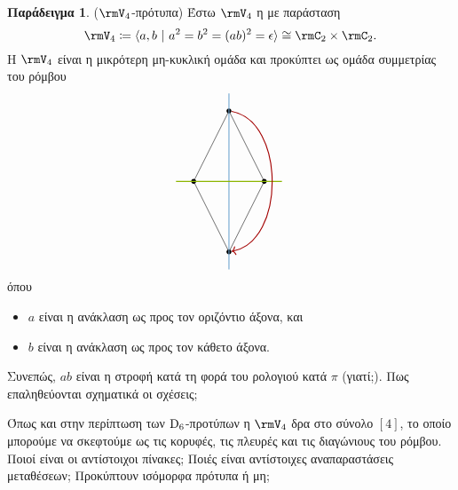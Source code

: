 \documentclass[12pt,a4paper,reqno]{amsart}
\theoremstyle{definition}
\newtheorem*{example}{Παράδειγμα}
\newcommand{\defn}[1]{{\color{mylightblue}{#1}}}
\begin{document}
\begin{example}{\rm($\rmV_4$-πρότυπα)}
    Έστω $\rmV_4$ η \defn{4-ομάδα του Klein} με παράσταση
    \[
    \rmV_4 \coloneqq 
    \langle a, b \ \vert \ a^2 = b^2 = (ab)^2 = \epsilon \rangle  \cong \rmC_2 \times \rmC_2.
    \]
    Η $\rmV_4$ είναι η μικρότερη μη-κυκλική ομάδα και προκύπτει ως ομάδα συμμετρίας του ρόμβου
    \[
    \begin{tikzpicture}
        \tikzstyle{point}=[circle,fill,inner sep=0pt, minimum width=4pt, minimum height=4pt]

        \node (A)[point] at (0,2) {};
        \node (B)[point] at (1,0) {};
        \node (C)[point] at (0,-2) {};
        \node (D)[point] at (-1,0) {};

        \coordinate (center) at (0,0);

        \draw (A.center) -- (B.center) -- (C.center) -- (D.center) -- cycle;

        \draw[thick, iceberg] (0,-2.5) -- (0,2.5);  %
        \draw[thick, applegreen] (-1.5,0) -- (1.5,0);     %

        \draw[->, thick, bend left=80, darkcandyapplered] (A) to (C);
    \end{tikzpicture}
    \]
    όπου 
    \begin{itemize}
        \item $a$ είναι η ανάκλαση ως προς τον οριζόντιο άξονα, και
        \item $b$ είναι η ανάκλαση ως προς τον κάθετο άξονα.
    \end{itemize}
    Συνεπώς, $ab$ είναι η στροφή κατά τη φορά του ρολογιού κατά $\pi$ (γιατί;). Πως επαληθεύονται σχηματικά οι σχέσεις;

    Όπως και στην περίπτωση των $\mathrm{D}_6$-προτύπων η $\rmV_4$ δρα στο σύνολο $[4]$, το οποίο μπορούμε να σκεφτούμε ως τις κορυφές, τις πλευρές και τις διαγώνιους του ρόμβου. Ποιοί είναι οι αντίστοιχοι πίνακες; Ποιές είναι αντίστοιχες αναπαραστάσεις μεταθέσεων; Προκύπτουν ισόμορφα πρότυπα ή μη;
\end{example}
\end{document}

